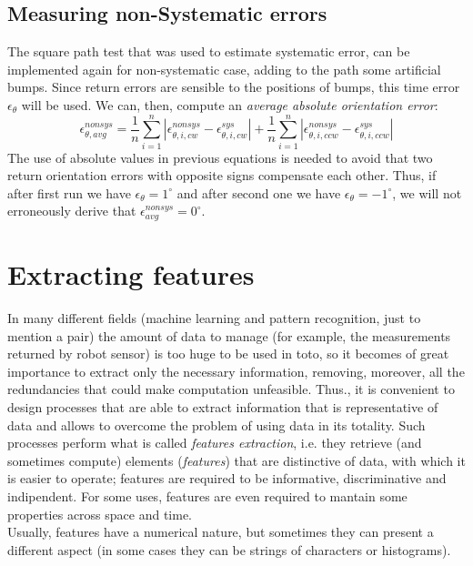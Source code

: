 \documentclass[a4paper, onecolumn]{report}
\begin{document}
\subsection{Measuring non-Systematic errors}
The square path test that was used to estimate systematic error, can be implemented again for non-systematic case, adding to the path some artificial bumps. Since return errors are sensible to the positions of bumps, this time error $\epsilon_\theta$ will be used. We can, then, compute an \emph{average absolute orientation error}:
\begin{equation}
	\epsilon_{\theta, avg}^{nonsys} = \frac{1}{n}\sum_{i=1}^{n}|\epsilon_{\theta,i, cw}^{nonsys}-\epsilon_{\theta,i, cw}^{sys}| + \frac{1}{n}\sum_{i=1}^{n}|\epsilon_{\theta,i, ccw}^{nonsys}-\epsilon_{\theta,i, ccw}^{sys}|
\end{equation}
The use of absolute values in previous equations is needed to avoid that two return orientation errors with opposite signs compensate each other. Thus, if after first run we have $\epsilon_\theta=1^\circ$ and after second one we have $\epsilon_\theta = -1^\circ$, we will not erroneously derive that $\epsilon_{avg}^{nonsys}=0^\circ$.

\section{Extracting features}
In many different fields (machine learning and pattern recognition, just to mention a pair) the amount of data to manage (for example, the measurements returned by robot sensor) is too huge to be used in toto, so it becomes of great importance to extract only the necessary information, removing, moreover, all the redundancies that could make computation unfeasible. Thus., it is convenient to design processes that are able to extract information that is representative of data and allows to overcome the problem of using data in its totality. Such processes perform what is called \emph{features extraction}, i.e. they retrieve (and sometimes compute) elements (\emph{features}) that are distinctive of data, with which it is easier to operate; features are required to be informative, discriminative and indipendent. For some uses, features are even required to mantain some properties across space and time. \\
Usually, features have a numerical nature, but sometimes they can present a different aspect (in some cases they can be strings of characters or histograms).
\end{document}
